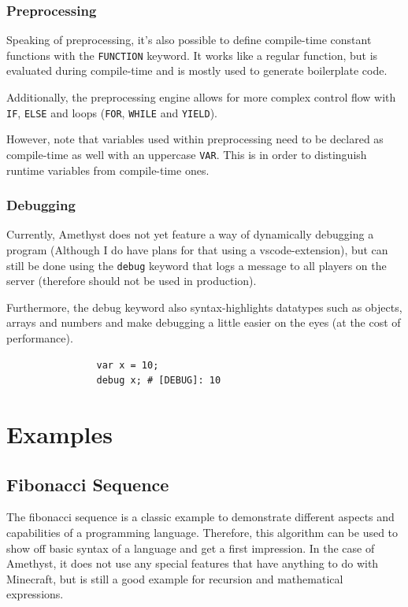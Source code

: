 \documentclass[12pt]{article}
\begin{document}
        \subsubsection{Preprocessing}
            Speaking of preprocessing, it's also possible to define compile-time constant functions with the \lstinline{FUNCTION} keyword. It works like a regular function, but is evaluated during compile-time and is mostly used to generate boilerplate code.
            
            Additionally, the preprocessing engine allows for more complex control flow with \lstinline{IF}, \lstinline{ELSE} and loops (\lstinline{FOR}, \lstinline{WHILE} and \lstinline{YIELD}).
            
            However, note that variables used within preprocessing need to be declared as compile-time as well with an uppercase \lstinline{VAR}. This is in order to distinguish runtime variables from compile-time ones. 
            
        \subsubsection{Debugging}
            Currently, Amethyst does not yet feature a way of dynamically debugging a program (Although I do have plans for that using a vscode-extension), but can still be done using the \lstinline{debug} keyword that logs a message to all players on the server (therefore should not be used in production).
            
            Furthermore, the debug keyword also syntax-highlights datatypes such as objects, arrays and numbers and make debugging a little easier on the eyes (at the cost of performance).
            
            \begin{lstlisting}
                var x = 10;
                debug x; # [DEBUG]: 10
            \end{lstlisting}
   
\section{Examples}
	\subsection{Fibonacci Sequence}
		The fibonacci sequence is a classic example to demonstrate different aspects and capabilities of a programming language. Therefore, this algorithm can be used to show off basic syntax of a language and get a first impression. In the case of Amethyst, it does not use any special features that have anything to do with Minecraft, but is still a good example for recursion and mathematical expressions.
		
\end{document}

